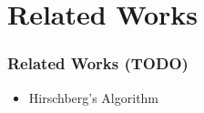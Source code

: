 \section{Related Works}

\begin{frame}
    \frametitle{Related Works (TODO)}
    \begin{itemize}
    	\item Hirschberg's Algorithm
    \end{itemize}
\end{frame}